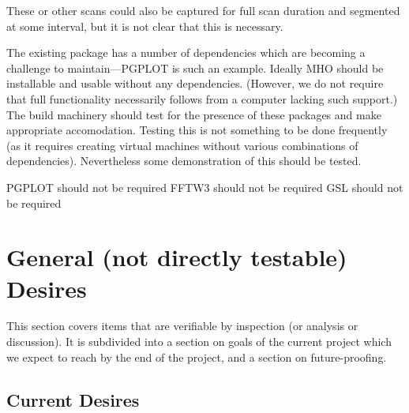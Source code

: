 \TBC{}

These or other scans could also be captured for full scan duration and
segmented at some interval, but it is not clear that this is necessary.

The existing package has a number of dependencies which are becoming
a challenge to maintain---\acs{PGPLOT} is such an example.  Ideally
\acs{MHO} should be installable and usable without any dependencies.
(However, we do not require that full functionality necessarily follows
from a computer lacking such support.)  The build machinery should test
for the presence of these packages and make appropriate accomodation.
Testing this is not something to be done frequently (as it requires
creating virtual machines without various combinations of dependencies).
Nevertheless some demonstration of this should be tested.
%
%
\newsavebox{\xpgplot}
  \addtocounter{req}{1}
\newsavebox{\xfftwthree}
  \addtocounter{req}{1}
\addtocounter{req}{-2}
%
\begin{description}
 \acs{PGPLOT} should not be required
 \acs{FFTW3} should not be required
 \acs{GSL} should not be required
\end{description}

\section{General (not directly testable) Desires}
\label{sec:desires}

This section covers items that are verifiable by inspection (or analysis
or discussion).  It is subdivided into a section on goals of the current
project which we expect to reach by the end of the project, and a section
on future-proofing.

\subsection{Current Desires}
\label{sec:currentdesires}

